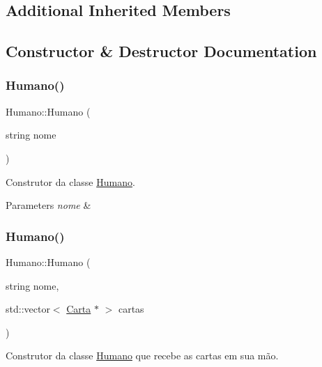 \subsection*{Additional Inherited Members}


\subsection{Constructor \& Destructor Documentation}
\mbox{\label{class_humano_a0a77741425558703321b7a1f24bf5f8f}} 
\subsubsection{\texorpdfstring{Humano()}{Humano()}\hspace{0.1cm}{\footnotesize\ttfamily [1/2]}}
{\footnotesize\ttfamily Humano\+::\+Humano (\begin{DoxyParamCaption}\item[{string}]{nome }\end{DoxyParamCaption})}



Construtor da classe \mbox{\hyperlink{class_humano}{Humano}}. 


\begin{DoxyParams}{Parameters}
{\em nome} & \\
\hline
\end{DoxyParams}
\mbox{\label{class_humano_a7af6096fca83f9c64cf893156f749e22}} 
\subsubsection{\texorpdfstring{Humano()}{Humano()}\hspace{0.1cm}{\footnotesize\ttfamily [2/2]}}
{\footnotesize\ttfamily Humano\+::\+Humano (\begin{DoxyParamCaption}\item[{string}]{nome,  }\item[{std\+::vector$<$ \mbox{\hyperlink{class_carta}{Carta}} $\ast$ $>$}]{cartas }\end{DoxyParamCaption})}



Construtor da classe \mbox{\hyperlink{class_humano}{Humano}} que recebe as cartas em sua mão. 



